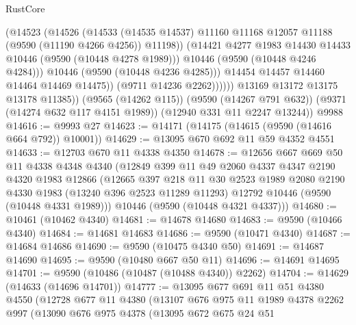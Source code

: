 \begin{lexlean}{RustCore}
\begin{coremodule}
                          (@14523
                            (@14526
                              (@14533
                                (@14535 @14537)
                                @11160
                                @11168
                                @12057
                                @11188
                                (@9590 (@11190 @4266 @4256))
                                @11198))
                            (@14421 @4277 @1983 @14430 @14433 @10446 (@9590 (@10448 @4278 @1989)))
                            @10446
                            (@9590 (@10448 @4246 @4284)))
                          @10446
                          (@9590 (@10448 @4236 @4285)))
                        @14454
                        @14457
                        @14460
                        @14464
                        @14469
                        @14475))
                    (@9711 @14236 @2262))))))
          @13169
          @13172
          @13175
          @13178
          @11385))
      (@9565 (@14262 @115))
      (@9590 (@14267 @791 @632))
      (@9371 (@14274 @632 @117 @4151 @1989))
      (@12940 @331 @11 @2247 @13244))
    @9988
@14616 := @9993 @27
@14623 := @14171 (@14175 (@14615 (@9590 (@14616 @664 @792)) @10001))
@14629 := @13095 @670 @692 @11 @59 @4352 @4551
@14633 := @12703 @670 @11 @4338 @4350
@14678 := @12656
    @667
    @669
    @50
    @11
    @4338
    @4348
    @4340
    (@12849
      @399
      @11
      @49
      @2060
      @4337
      @4347
      @2190
      @4320
      @1983
      @12866
      (@12665
        @397
        @218
        @11
        @30
        @2523
        @1989
        @2080
        @2190
        @4330
        @1983
        (@13240 @396 @2523 @11289 @11293)
        @12792
        @10446
        (@9590 (@10448 @4331 @1989)))
      @10446
      (@9590 (@10448 @4321 @4337)))
@14680 := @10461 (@10462 @4340)
@14681 := @14678 @14680
@14683 := @9590 (@10466 @4340)
@14684 := @14681 @14683
@14686 := @9590 (@10471 @4340)
@14687 := @14684 @14686
@14690 := @9590 (@10475 @4340 @50)
@14691 := @14687 @14690
@14695 := @9590 (@10480 @667 @50 @11)
@14696 := @14691 @14695
@14701 := @9590 (@10486 (@10487 (@10488 @4340)) @2262)
@14704 := @14629 (@14633 (@14696 @14701))
@14777 := @13095
    @677
    @691
    @11
    @51
    @4380
    @4550
    (@12728
      @677
      @11
      @4380
      (@13107
        @676
        @975
        @11
        @1989
        @4378
        @2262
        @997
        (@13090
          @676
          @975
          @4378
          (@13095
            @672
            @675
            @24
            @51

\end{coremodule}
\end{lexlean}
